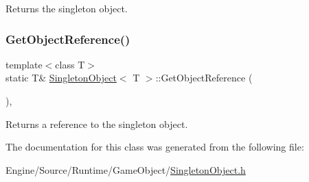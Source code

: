 Returns the singleton object. \mbox{\label{class_singleton_object_adabe7b9f1b8ed85ec9a2e2b4a6d29aac}} 
\subsubsection{\texorpdfstring{Get\+Object\+Reference()}{GetObjectReference()}}
{\footnotesize\ttfamily template$<$class T$>$ \\
static T\& \mbox{\hyperlink{class_singleton_object}{Singleton\+Object}}$<$ T $>$\+::Get\+Object\+Reference (\begin{DoxyParamCaption}{ }\end{DoxyParamCaption})\hspace{0.3cm}{\ttfamily [inline]}, {\ttfamily [static]}}

Returns a reference to the singleton object. 

The documentation for this class was generated from the following file\+:\begin{DoxyCompactItemize}
\item 
Engine/\+Source/\+Runtime/\+Game\+Object/\mbox{\hyperlink{_singleton_object_8h}{Singleton\+Object.\+h}}\end{DoxyCompactItemize}
